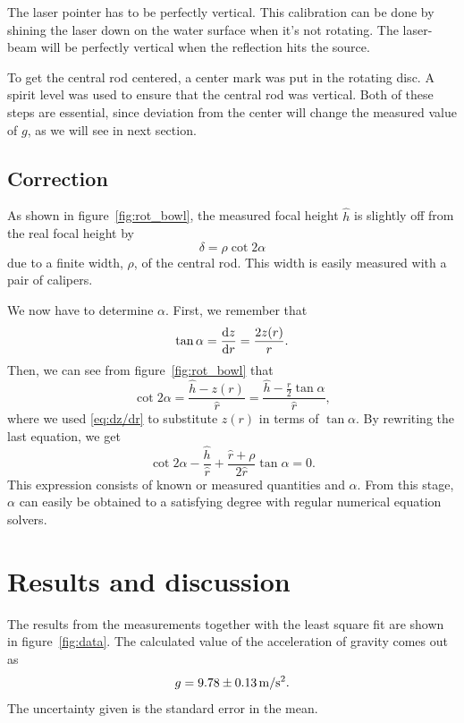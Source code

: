 \documentclass[12pt, a4paper, twocolumn]{article}
\begin{document}
The laser pointer has to be perfectly vertical. This calibration can be done by shining the laser down on the water surface when it's not rotating. The laser-beam will be perfectly vertical when the reflection hits the source.

To get the central rod centered, a center mark was put in the rotating disc. A spirit level was used to ensure that the central rod was vertical. Both of these steps are essential, since deviation from the center will change the measured value of $g$, as we will see in next section. 


\subsection{Correction}\label{sec:corrections}

As shown in figure~\ref{fig:rot_bowl}, the measured focal height $\hat{h}$ is slightly off from the real focal height by 
\begin{equation}%
\delta=\rho\cot 2\alpha
\end{equation}
due to a finite width, $\rho$, of the central rod. This width is easily measured with a pair of calipers.

We now have to determine $\alpha$. First, we remember that
\begin{equation}\label{eq:dz/dr}
\tan\alpha=\dv{z}{r} =\frac{2 z(r)}{r}.
\end{equation}
Then, we can see from figure~\ref{fig:rot_bowl} that 
\begin{equation}
\cot 2\alpha =\frac{\hat{h} - z(r)}{\hat{r}} 
= \frac{\hat{h}-\frac{r}{2}\tan\alpha }{\hat{r}},
\end{equation}
where we used \eqref{eq:dz/dr} to substitute $z(r)$ in terms of $\tan\alpha$. By rewriting the last equation, we get
\begin{equation}
\cot 2\alpha 
-\frac{\hat{h}}{\hat{r}}
+\frac{\hat{r}+\rho}{2\hat{r}}\tan\alpha  = 0.
\end{equation}
This expression consists of known or measured quantities and $\alpha$. From this stage, $\alpha$ can easily be obtained to a satisfying degree with regular numerical equation solvers.


\section{Results and discussion}

The results from the measurements together with the least square fit are shown in figure~\ref{fig:data}. The calculated value of the acceleration of gravity comes out as
\begin{equation}
g=\unit[9.78\pm 0.13]{m/s^2}.
\end{equation}
The uncertainty given is the standard error in the mean.
\end{document}
